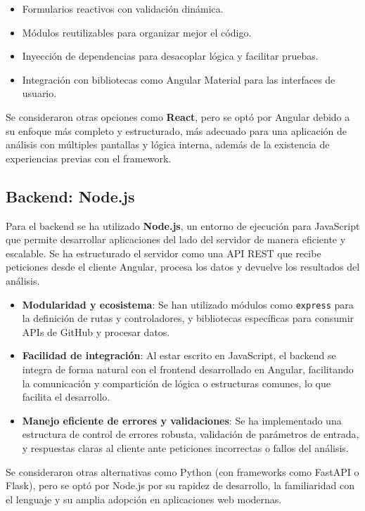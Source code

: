 \begin{itemize}
  \item Formularios reactivos con validación dinámica.
  \item Módulos reutilizables para organizar mejor el código.
  \item Inyección de dependencias para desacoplar lógica y facilitar pruebas.
  \item Integración con bibliotecas como Angular Material para las interfaces de usuario.
\end{itemize}

Se consideraron otras opciones como \textbf{React}, pero se optó por Angular debido a su enfoque más completo y estructurado, más adecuado para una aplicación de análisis con múltiples pantallas y lógica interna, además de la existencia de experiencias previas con el framework.

\subsection{Backend: Node.js}

Para el backend se ha utilizado \textbf{Node.js}, un entorno de ejecución para JavaScript que permite desarrollar aplicaciones del lado del servidor de manera eficiente y escalable. Se ha estructurado el servidor como una API REST que recibe peticiones desde el cliente Angular, procesa los datos y devuelve los resultados del análisis.

\begin{itemize}  
  \item \textbf{Modularidad y ecosistema}: Se han utilizado módulos como \texttt{express} para la definición de rutas y controladores, y bibliotecas específicas para consumir APIs de GitHub y procesar datos.
  
  \item \textbf{Facilidad de integración}: Al estar escrito en JavaScript, el backend se integra de forma natural con el frontend desarrollado en Angular, facilitando la comunicación y compartición de lógica o estructuras comunes, lo que facilita el desarrollo.
  
  \item \textbf{Manejo eficiente de errores y validaciones}: Se ha implementado una estructura de control de errores robusta, validación de parámetros de entrada, y respuestas claras al cliente ante peticiones incorrectas o fallos del análisis.
\end{itemize}

Se consideraron otras alternativas como Python (con frameworks como FastAPI o Flask), pero se optó por Node.js por su rapidez de desarrollo, la familiaridad con el lenguaje y su amplia adopción en aplicaciones web modernas.

